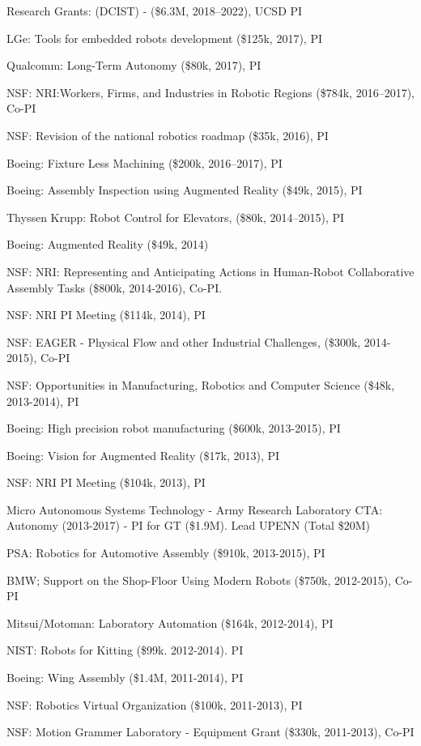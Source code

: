 \documentclass{article}
\begin{document}
\begin{cv}
\begin{cvlist}{Research Grants:}
  (DCIST) - (\$6.3M, 2018--2022), UCSD PI
\item LGe: Tools for embedded robots development (\$125k, 2017), PI
\item Qualcomm: Long-Term Autonomy (\$80k, 2017), PI
\item NSF: NRI:Workers, Firms, and Industries in Robotic Regions
  (\$784k, 2016--2017), Co-PI
\item NSF: Revision of the national robotics roadmap (\$35k, 2016), PI
\item Boeing: Fixture Less Machining (\$200k, 2016--2017), PI
\item Boeing: Assembly Inspection using Augmented Reality (\$49k,
  2015), PI
\item Thyssen Krupp: Robot Control for Elevators, (\$80k, 2014--2015), PI
\item Boeing: Augmented Reality (\$49k, 2014)
\item NSF: NRI: Representing and Anticipating Actions in Human-Robot
  Collaborative Assembly Tasks (\$800k, 2014-2016), Co-PI.
\item NSF: NRI PI Meeting (\$114k, 2014), PI
\item NSF: EAGER - Physical Flow and other Industrial Challenges,
  (\$300k, 2014-2015), Co-PI
\item NSF: Opportunities in Manufacturing, Robotics and Computer Science
  (\$48k, 2013-2014), PI
\item Boeing: High precision robot manufacturing (\$600k, 2013-2015), PI
\item Boeing: Vision for Augmented Reality (\$17k, 2013), PI
\item NSF: NRI PI Meeting (\$104k, 2013), PI
\item Micro Autonomous Systems Technology - Army Research Laboratory
  CTA: Autonomy (2013-2017) - PI for GT (\$1.9M). Lead UPENN (Total
  \$20M) %
\item PSA: Robotics for Automotive Assembly (\$910k, 2013-2015), PI
\item BMW; Support on the Shop-Floor Using Modern Robots (\$750k,
  2012-2015), Co-PI
\item Mitsui/Motoman: Laboratory Automation (\$164k, 2012-2014), PI
\item NIST: Robots for Kitting (\$99k. 2012-2014). PI
\item Boeing: Wing Assembly (\$1.4M, 2011-2014), PI
\item NSF: Robotics Virtual Organization (\$100k, 2011-2013), PI
\item NSF: Motion Grammer Laboratory - Equipment Grant (\$330k, 2011-2013), Co-PI

\end{cvlist}
\end{cv}
\end{document}
